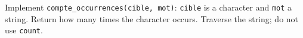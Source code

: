 Implement \texttt{compte\_occurrences(cible, mot)}: \texttt{cible} is a character and \texttt{mot} a string. Return how many times the character occurs. Traverse the string; do not use \texttt{count}.

